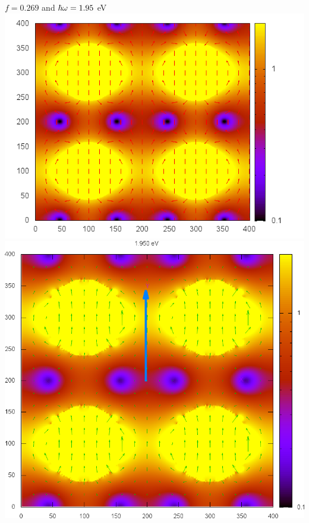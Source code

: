 \documentclass[preprint,12pt]{revtex4}
\begin{document}
\begin{center}
$f=0.269$ and $\hbar\omega=1.95$ eV
\includegraphics[scale=.31]{plots/manda/dipolar_W1.95_f.269}%
\includegraphics[scale=.2]{plots/manda/e-cilindro_A0.00_S1.000_f0.269_principal_0.00_ave_Nh_100_epsa_au_W1.950_epsb_8.000-0.000_dir_yp-dat.2x2}%
\end{center}
\end{document}

